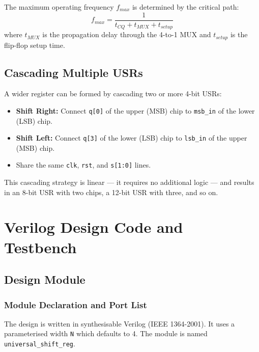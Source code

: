 \documentclass[12pt,a4paper]{report}
\newcommand{\signal}[1]{\texttt{\textcolor{codeblue}{#1}}}
\begin{document}
The maximum operating frequency $f_{max}$ is determined by the critical path:
\[f_{max} = \frac{1}{t_{CQ} + t_{MUX} + t_{setup}}
\]
where $t_{MUX}$ is the propagation delay through the 4-to-1 MUX and $t_{setup}$ is the flip-flop setup time.

\section{Cascading Multiple USRs}

A wider register can be formed by cascading two or more 4-bit USRs:
\begin{itemize}
    \item \textbf{Shift Right:} Connect \signal{q[0]} of the upper (MSB) chip to \signal{msb\_in} of the lower (LSB) chip.
    \item \textbf{Shift Left:} Connect \signal{q[3]} of the lower (LSB) chip to \signal{lsb\_in} of the upper (MSB) chip.
    \item Share the same \signal{clk}, \signal{rst}, and \signal{s[1:0]} lines.
\end{itemize}
This cascading strategy is linear — it requires no additional logic — and results in an 8-bit USR with two chips, a 12-bit USR with three, and so on.

\chapter{Verilog Design Code and Testbench}

\section{Design Module}

\subsection{Module Declaration and Port List}

The design is written in synthesisable Verilog (IEEE 1364-2001). It uses a parameterised width \texttt{N} which defaults to 4. The module is named \texttt{universal\_shift\_reg}.
\end{document}
